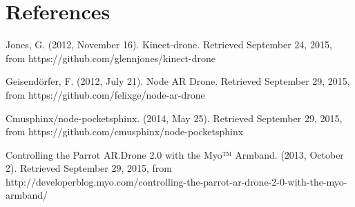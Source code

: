 \documentclass{article}
\begin{document}

	\section{References}
	\begin{thebibliography}{1}

		 Jones, G. (2012, November 16). Kinect-drone. Retrieved September 24, 2015, from https://github.com/glennjones/kinect-drone

		 Geisendörfer, F. (2012, July 21). Node AR Drone. Retrieved September 29, 2015, from https://github.com/felixge/node-ar-drone

		 Cmusphinx/node-pocketsphinx. (2014, May 25). Retrieved September 29, 2015, from https://github.com/cmusphinx/node-pocketsphinx

		 Controlling the Parrot AR.Drone 2.0 with the Myo™ Armband. (2013, October 2). Retrieved September 29, 2015, from http://developerblog.myo.com/controlling-the-parrot-ar-drone-2-0-with-the-myo-armband/

	\end{thebibliography}
\end{document}
